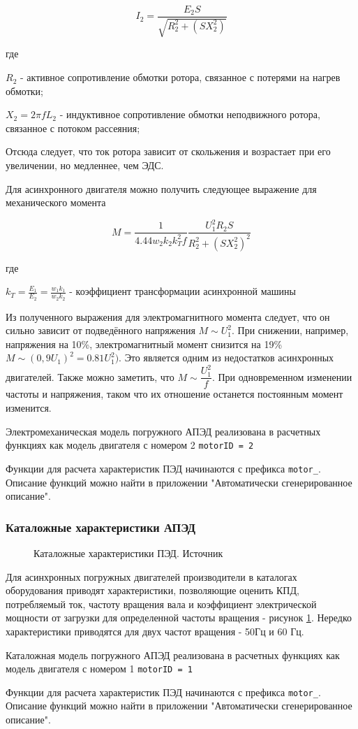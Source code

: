$$  I_2 = \frac{E_2 S}{\sqrt{R_2^2+(S X_2^2)}} $$

где 

$R_2$ -  активное сопротивление обмотки ротора, связанное с потерями на нагрев обмотки;  

$X_2 = 2 \pi f L_2$ - индуктивное сопротивление обмотки неподвижного ротора, связанное с потоком рассеяния;

Отсюда следует, что ток ротора зависит от скольжения и возрастает при его увеличении, но медленнее, чем ЭДС.

Для асинхронного двигателя можно получить следующее выражение для механического момента 

$$ M = \frac{1}{4.44 w_2 k_2 k_T^2 f} \frac{U_1^2 R_2 S}{R_2^2 + (S X_2^2)^2}$$

где 

$k_T = \frac{E_1}{E_2} = \frac{w_1 k_1}{w_2 k_2}$ - коэффициент трансформации асинхронной машины

Из полученного выражения для электромагнитного момента следует, что он сильно зависит от подведённого напряжения $M \sim U_1^2$. При снижении, например, напряжения на 10\%, электромагнитный момент снизится на 19\% $M \sim (0,9U_1)^2=0.81 U_1^2)$. Это является одним из недостатков асинхронных двигателей. Также можно заметить, что $M \sim \dfrac{U_1^2}{f} $. При одновременном изменении частоты и напряжения, таком что их отношение останется постоянным момент изменится. 


Электромеханическая модель погружного АПЭД реализована в расчетных функциях \unf{} как модель двигателя с номером 2  \texttt{motorID = 2}

Функции для расчета характеристик ПЭД начинаются с префикса \texttt{motor_}. Описание функций можно найти в приложении "Автоматически сгенерированное описание".

\subsubsection{Каталожные характеристики АПЭД}

\begin{figure}[h!]
	\caption{Каталожные характеристики ПЭД. Источник \cite{Novomet_2013} }
	\label{ris:novomet_motor_1}
\end{figure}

Для асинхронных погружных двигателей производители в каталогах оборудования приводят характеристики, позволяющие оценить КПД, потребляемый ток, частоту вращения вала и коэффициент электрической мощности от загрузки для определенной частоты вращения - рисунок \ref{ris:novomet_motor_1}. Нередко характеристики приводятся для двух частот вращения - 50Гц и 60 Гц.


Каталожная модель погружного АПЭД реализована в расчетных функциях \unf{} как модель двигателя с номером 1  \texttt{motorID = 1}

Функции для расчета характеристик ПЭД начинаются с префикса \texttt{motor_}. Описание функций можно найти в приложении "Автоматически сгенерированное описание".



\newpage
